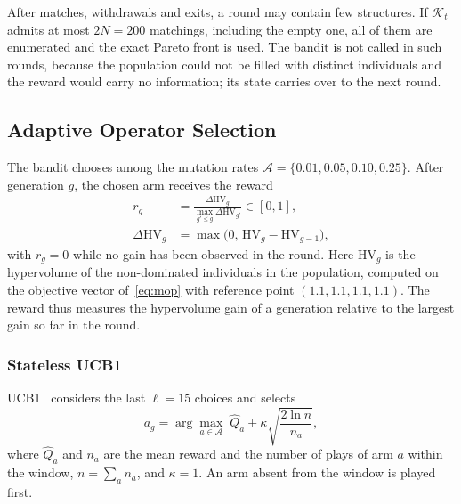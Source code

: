 \documentclass[journal]{IEEEtran}
\begin{document}
After matches, withdrawals and exits, a round may contain few
structures.
If $\mathcal{K}_t$ admits at most $2N = 200$ matchings, including the
empty one, all of them are enumerated and the exact Pareto front is
used.
The bandit is not called in such rounds, because the population could
not be filled with distinct individuals and the reward would carry no
information; its state carries over to the next round.

\subsection{Adaptive Operator Selection}
\label{sec:method:aos}

The bandit chooses among the mutation rates
$\mathcal{A} = \{0.01, 0.05, 0.10, 0.25\}$.
After generation $g$, the chosen arm receives the reward
\begin{equation}
\begin{aligned}
  r_g &= \frac{\Delta\mathrm{HV}_g}{\max_{g' \leq g} \Delta\mathrm{HV}_{g'}}
        \in [0, 1], \\
  \Delta\mathrm{HV}_g &= \max\bigl(0,\, \mathrm{HV}_g - \mathrm{HV}_{g-1}\bigr),
\end{aligned}
\label{eq:reward}
\end{equation}
with $r_g = 0$ while no gain has been observed in the round.
Here $\mathrm{HV}_g$ is the hypervolume of the non-dominated individuals
in the population, computed on the objective vector of~\eqref{eq:mop}
with reference point $(1.1, 1.1, 1.1, 1.1)$.
The reward thus measures the hypervolume gain of a generation relative
to the largest gain so far in the round.

\subsubsection{Stateless UCB1}
UCB1~\cite{auer2002finite} considers the last $\ell = 15$ choices and
selects
\begin{equation}
  a_g = \arg\max_{a \in \mathcal{A}} \;
        \hat{Q}_a + \kappa \sqrt{\frac{2 \ln n}{n_a}} ,
  \label{eq:ucb1}
\end{equation}
where $\hat{Q}_a$ and $n_a$ are the mean reward and the number of plays
of arm $a$ within the window, $n = \sum_{a} n_a$, and $\kappa = 1$.
An arm absent from the window is played first.
\end{document}
